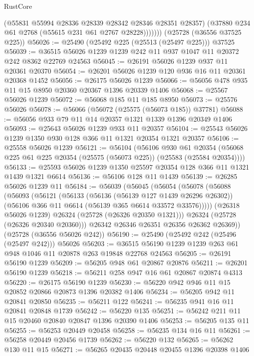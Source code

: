 \begin{lexlean}{RustCore}
\begin{coremodule}
              (@55831 @55994 @28336 @28339 @28342 @28346 @28351 @28357)
              (@37880 @234 @61 @2768 (@55615 @231 @61 @2767 @28228)))))))
    (@25728 (@36556 @37525 @225))
@56026 := @25490 (@25492 @225 (@25513 (@25497 @225))) @37525
@56039 := @36515 @56026 @1239 @1239 @242 @11 @937 @1047 @11 @20372 @242 @8362 @22769 @24563
@56045 := @26191 @56026 @1239 @937 @11 @20361 @20370
@56054 := @26201 @56026 @1239 @120 @936 @16 @11 @20361 @20368 @1452
@56056 := @26175 @56026 @1239
@56066 := @56056 @478 @935 @11 @15 @8950 @20360 @20367 @1396 @20339 @1406
@56068 := @25567 @56026 @1239
@56072 := @56068 @185 @11 @185 @8950
@56073 := @25576 @56026
@56078 := @56066 (@56072 (@25575 (@56073 @185)) @37781)
@56088 := @56056 @933 @79 @11 @14 @20357 @1321 @1339 @1396 @20349 @1406
@56093 := @25643 @56026 @1239 @933 @11 @20357
@56104 := @25543 @56026 @1239 @1350 @930 @128 @366 @11 @1321 @20354 @1321 @20357
@56106 := @25558 @56026 @1239
@56121 := @56104
    (@56106
      @930
      @61
      @20354
      (@56068 @225 @61 @225 @20354 (@25575 (@56073 @225)) (@25583 (@25584 @20354))))
@56133 := @25593 @56026 @1239 @1350 @25597 @20354 @128 @366 @11 @1321 @1439 @1321 @6614
@56136 := @56106 @128 @11 @1439
@56139 := @26285 @56026 @1239 @11
@56184 := @56039
    (@56045
      (@56054
        (@56078
          (@56088
            (@56093
              (@56121
                (@56133
                  (@56136 (@56139 @127 @1439 @26296 @26302))
                  (@56106 @366 @11 @6614 (@56139 @365 @6614 @33572 @33576)))))
            (@26318 @56026 @1239)
            @26324
            (@25728 (@26326 @20350 @1321)))
          @26324
          (@25728 (@26326 @20340 @20360)))
        @26342
        @26346
        @26351
        @26356
        @26362
        @26369))
    (@25728 (@36556 @56026 @242))
@56190 := @25490 (@25492 @242 (@25496 (@25497 @242))) @56026
@56203 := @36515 @56190 @1239 @1239 @263 @61 @948 @1046 @11 @20878 @263 @19848 @22768 @24563
@56205 := @26191 @56190 @1239
@56209 := @56205 @948 @61 @20867 @20876
@56211 := @26201 @56190 @1239
@56218 := @56211 @258 @947 @16 @61 @20867 @20874 @4313
@56220 := @26175 @56190 @1239
@56230 := @56220 @942 @946 @11 @15 @20852 @20866 @20873 @1396 @20382 @1406
@56234 := @56205 @942 @11 @20841 @20850
@56235 := @56211 @122
@56241 := @56235 @941 @16 @11 @20841 @20848 @1739
@56242 := @56220 @135
@56251 := @56242 @211 @11 @15 @20460 @20840 @20847 @1396 @20390 @1406
@56253 := @56205 @135 @11
@56255 := @56253 @20449 @20458
@56258 := @56235 @134 @16 @11
@56261 := @56258 @20449 @20456 @1739
@56262 := @56220 @132
@56265 := @56262 @130 @11 @15
@56271 := @56265 @20435 @20448 @20455 @1396 @20398 @1406

\end{coremodule}
\end{lexlean}
